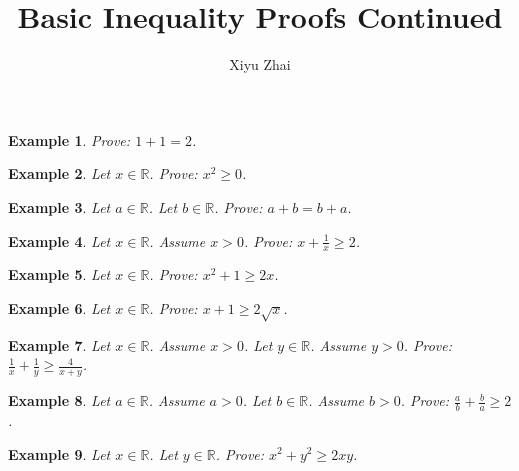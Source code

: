 \documentclass{article}
\newtheorem{example}{Example}
\begin{document}
\title{Basic Inequality Proofs Continued}
\author{Xiyu Zhai}
\maketitle

\begin{example}
    Prove: $1+1=2$.
\end{example}


\begin{example}
    Let $x\in\mathbb{R}$. Prove: $x^2\ge 0$.
\end{example}

\begin{example}
    Let $a\in\mathbb{R}$. Let $b\in\mathbb{R}$. Prove: $a+b=b+a$.
\end{example}

\begin{example}
    Let $x\in\mathbb{R}$. Assume $x> 0$. Prove: $x + \frac{1}{x} \ge 2$.
\end{example}

\begin{example}
    Let $x\in\mathbb{R}$. Prove: $x^2 + 1\ge 2x$.
\end{example}

\begin{example}
    Let $x\in\mathbb{R}$. Prove: $x + 1 \ge 2\sqrt{x}$.
\end{example}

\begin{example}
    Let $x\in\mathbb{R}$. Assume $x>0$.
    Let $y\in\mathbb{R}$. Assume $y>0$.
    Prove: $\frac{1}{x} + \frac{1}{y} \ge \frac{4}{x+y}$.
\end{example}

\begin{example}    Let $a\in\mathbb{R}$. Assume $a > 0$.
    Let $b\in\mathbb{R}$. Assume $b > 0$.
    Prove: $\frac{a}{b} + \frac{b}{a} \ge 2$.
\end{example}

\begin{example}
    Let $x\in\mathbb{R}$. Let $y\in\mathbb{R}$.
    Prove: $x^2 + y^2 \ge 2xy$.
\end{example}
\end{document}
